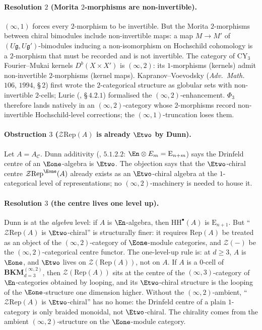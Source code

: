 \paragraph{Resolution \texorpdfstring{$2$}{2} (Morita \texorpdfstring{$2$}{2}-morphisms are non-invertible).}
$(\infty,1)$ forces every $2$-morphism to be invertible. But the
Morita $2$-morphisms between chiral bimodules include non-invertible
maps: a map $M\to M'$ of $(U\mathfrak g,U\mathfrak g')$-bimodules
inducing a non-isomorphism on Hochschild cohomology is a
$2$-morphism that must be recorded and is not invertible. The
category of CY$_3$ Fourier--Mukai kernels $D^b(X\times X')$ is
$(\infty,2)$: its $1$-morphisms (kernels) admit non-invertible
$2$-morphisms (kernel maps). Kapranov--Voevodsky (\emph{Adv.\ Math.}\
$106$, $1994$, \S\,$2$) first wrote the $2$-categorical structure
as globular sets with non-invertible $2$-cells; Lurie
(\cite{LurieHA}, \S\,$4$.$2$.$1$) formalised the
$(\infty,2)$-enhancement. $\Phi_3$ therefore lands natively in an
$(\infty,2)$-category whose $2$-morphisms record non-invertible
Hochschild-level corrections; the $(\infty,1)$-truncation loses
them.

\paragraph{Obstruction \texorpdfstring{$3$}{3} (\texorpdfstring{$\mathcal Z\mathrm{Rep}(A)$}{ZRep(A)} is already
\texorpdfstring{$\Etwo$}{E2} by Dunn).}
Let $A=A_{\mathcal C}$. Dunn additivity
(\cite{LurieHA}, $5$.$1$.$2$.$2$: $\En\otimes E_m=\mathrm E_{n+m}$)
says the Drinfeld centre of an $\Eone$-algebra is $\Etwo$. The
objection says that the $\Etwo$-chiral centre
$\mathcal Z\mathrm{Rep}^{\Eone}(A)$ already exists as an
$\Etwo$-chiral algebra at the $1$-categorical level of
representations; no $(\infty,2)$-machinery is needed to house it.

\paragraph{Resolution \texorpdfstring{$3$}{3} (the centre lives one level up).}
Dunn is at the \emph{algebra} level: if $A$ is $\En$-algebra, then
$\mathrm{HH}^\bullet(A)$ is $\mathrm E_{n+1}$. But
``$\mathcal Z\mathrm{Rep}(A)$ is $\Etwo$-chiral'' is structurally
finer: it requires $\mathrm{Rep}(A)$ be treated as an object of the
$(\infty,2)$-category of $\Eone$-module categories, and
$\mathcal Z(-)$ be the $(\infty,2)$-categorical centre functor. The
one-level-up rule is: at $d\geq 3$, $A$ is $\Eone$, and $\Etwo$ lives on
$\mathcal Z(\mathrm{Rep}(A))$, not on $A$. If $A$ is a $0$-cell of
$\mathbf{BKM}^{(\infty,2)}_{d=3}$,
then $\mathcal Z(\mathrm{Rep}(A))$ sits at the centre of the
$(\infty,3)$-category of $\En$-categories obtained by looping, and
its $\Etwo$-chiral structure is the looping of the $\Eone$-structure
one dimension higher. Without the $(\infty,2)$-ambient,
``$\mathcal Z\mathrm{Rep}(A)$ is $\Etwo$-chiral'' has no home: the
Drinfeld centre of a plain $1$-category is only braided monoidal,
not $\Etwo$-chiral. The chirality comes from the ambient
$(\infty,2)$-structure on the $\Eone$-module category.

